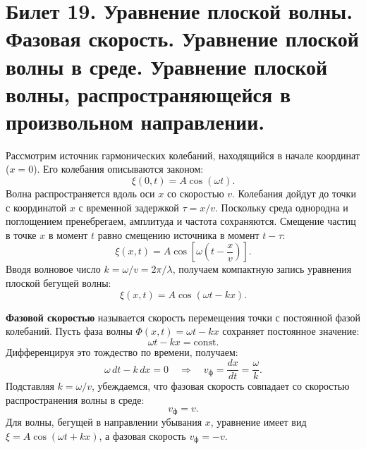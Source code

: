 \section{Билет 19. Уравнение плоской волны. Фазовая скорость. Уравнение плоской волны в среде. Уравнение плоской волны, распространяющейся в произвольном направлении.}

\begin{definition}
Рассмотрим источник гармонических колебаний, находящийся в начале координат ($x=0$). Его колебания описываются законом:
\begin{equation}
    \xi(0, t) = A \cos(\omega t).
\end{equation}
Волна распространяется вдоль оси $x$ со скоростью $v$. Колебания дойдут до точки с координатой $x$ с временной задержкой $\tau = x/v$. Поскольку среда однородна и поглощением пренебрегаем, амплитуда и частота сохраняются. Смещение частиц в точке $x$ в момент $t$ равно смещению источника в момент $t - \tau$:
\begin{equation}
    \xi(x, t) = A \cos\left[\omega \left(t - \frac{x}{v}\right)\right]. \label{eq:plane_wave_19}
\end{equation}
Вводя волновое число $k = \omega/v = 2\pi/\lambda$, получаем компактную запись уравнения плоской бегущей волны:
\begin{equation}
    \xi(x, t) = A \cos(\omega t - kx). \label{eq:plane_wave_k}
\end{equation}
\end{definition}

\begin{theorem}
\textbf{Фазовой скоростью} называется скорость перемещения точки с постоянной фазой колебаний. Пусть фаза волны $\Phi(x, t) = \omega t - kx$ сохраняет постоянное значение:
\begin{equation}
    \omega t - kx = \text{const}.
\end{equation}
Дифференцируя это тождество по времени, получаем:
\begin{equation}
    \omega \, dt - k \, dx = 0 \quad \Rightarrow \quad v_{\text{ф}} = \frac{dx}{dt} = \frac{\omega}{k}.
\end{equation}
Подставляя $k = \omega/v$, убеждаемся, что фазовая скорость совпадает со скоростью распространения волны в среде:
\begin{equation}
    v_{\text{ф}} = v.
\end{equation}
Для волны, бегущей в направлении убывания $x$, уравнение имеет вид $\xi = A\cos(\omega t + kx)$, а фазовая скорость $v_{\text{ф}} = -v$.
\end{theorem}

